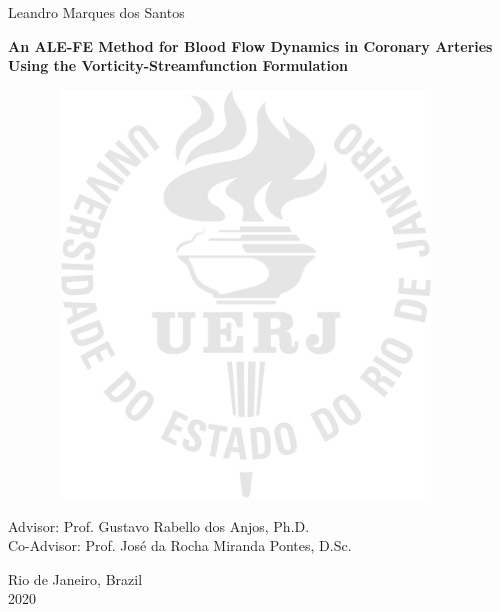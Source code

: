 \begin{center}

{\large Leandro Marques dos Santos}

\vspace{2cm}

\textbf{\large 
An ALE-FE Method for Blood Flow Dynamics in Coronary Arteries Using the Vorticity-Streamfunction Formulation}
\vspace{1.0cm}

\begin{figure}[hbt!]
\begin{center}
\includegraphics[width=10.48cm,height=10.8cm]{logos/logo_uerj_mark}
\end{center}
\end{figure}

\vspace{-9cm}
\begin{flushright}
\parbox{8cm}{
}
\end{flushright}

\vspace{4.0cm}

{\large Advisor: Prof. Gustavo Rabello dos Anjos, Ph.D.\\
        Co-Advisor: Prof. José da Rocha Miranda Pontes, D.Sc.}\\

\par\vfill

{\large Rio de Janeiro, Brazil\\2020}

\end{center}
